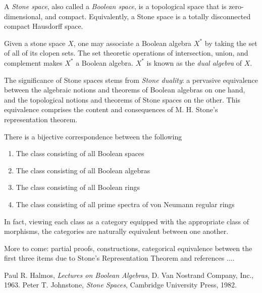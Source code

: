 \documentclass[12pt]{article}
\begin{document}
 A \emph{Stone space}, also called a \emph{Boolean space}, is a topological space that is zero-dimensional,  and compact.  Equivalently, a Stone space is a totally disconnected compact Hausdorff space.

Given a stone space $X$, one may associate a Boolean algebra $X^*$ by taking the set of all of its clopen sets.  The set theoretic operations of intersection, union, and complement makes $X^*$ a Boolean algebra.  $X^*$ is known as the \emph{dual algebra} of $X$.

The significance of Stone spaces stems from \emph{Stone duality}:
a pervasive equivalence between the algebraic notions and theorems
of Boolean algebras on one hand, and the topological notions and
theorems of Stone spaces on the other. This equivalence comprises
the content and consequences of M. H. Stone's representation
theorem.

There is a bijective correspondence between the following

\begin{enumerate}
\item The class consisting of all Boolean spaces
\item The class consisting of all Boolean algebras
\item The class consisting of all Boolean rings
\item The class consisting of all prime spectra of von Neumann regular rings
\end{enumerate}

In fact, viewing each class as a category equipped with the appropriate class of morphisms, the categories are naturally equivalent between one another.

More to come: partial proofs, constructions, categorical equivalence between the first three items due to Stone's Representation Theorem and references $\dots$.

\begin{thebibliography}{2}
 Paul R. Halmos, \emph{Lectures on Boolean Algebras}, D. Van Nostrand Company, Inc., 1963.
 Peter T. Johnstone, \emph{Stone Spaces}, Cambridge University Press, 1982.
\end{thebibliography}
\end{document}
